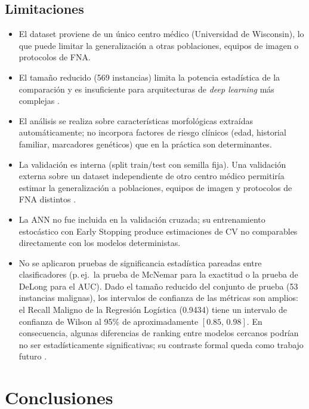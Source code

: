 \documentclass[journal]{IEEEtran}
\begin{document}
\subsection{Limitaciones}
\begin{itemize}
  \item El dataset proviene de un único centro médico
  (Universidad de Wisconsin), lo que puede limitar la
  generalización a otras poblaciones, equipos de imagen
  o protocolos de FNA.

  \item El tamaño reducido (569 instancias) limita la
  potencia estadística de la comparación y es insuficiente
  para arquitecturas de \textit{deep learning} más complejas \cite{chougrad2018}.

  \item El análisis se realiza sobre características
  morfológicas extraídas automáticamente; no incorpora
  factores de riesgo clínicos (edad, historial familiar,
  marcadores genéticos) que en la práctica son determinantes.

  \item La validación es interna (split train/test con
  semilla fija). Una validación externa sobre un dataset
  independiente de otro centro médico permitiría estimar la generalización a poblaciones, equipos de imagen y protocolos de FNA distintos \cite{hastie2009}.

  \item La ANN no fue incluida en la validación cruzada;
  su entrenamiento estocástico con Early Stopping produce
  estimaciones de CV no comparables directamente con los
  modelos deterministas.

  \item No se aplicaron pruebas de significancia estadística
  pareadas entre clasificadores (p.\,ej.\ la prueba de
  McNemar para la exactitud o la prueba de DeLong para el
  AUC). Dado el tamaño reducido del conjunto de prueba
  (53 instancias malignas), los intervalos de confianza
  de las métricas son amplios: el Recall Maligno de la
  Regresión Logística (0.9434) tiene un intervalo de
  confianza de Wilson al 95\% de aproximadamente
  $[0.85,\,0.98]$. En consecuencia, algunas diferencias
  de ranking entre modelos cercanos podrían no ser
  estadísticamente significativas; su contraste formal
  queda como trabajo futuro \cite{sokolova2009}.
\end{itemize}

\section{Conclusiones}
\end{document}
